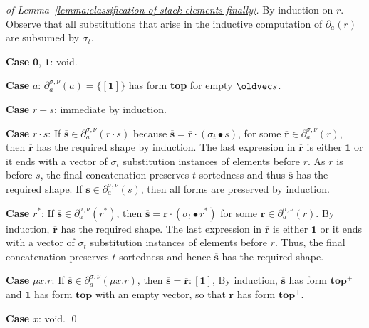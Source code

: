 \documentclass[runningheads, envcountsame, a4paper]{llncs}
\let\vec\oldvec
\newcommand\pderiv[3][{}]{\partial^{#1}_{#3}(#2)}
\newcommand\Rnull{\mathbf0}
\newcommand\Rempty{\mathbf1}
\newcommand\PUSH{:}
\newcommand\SINGLETON[1]{{[#1]}}
\newcommand\RS{\ensuremath{\overline{\mathbf{r}}}}
\renewcommand\SS{\ensuremath{\overline{\mathbf{s}}}}
\newcommand\ApplySubst[2]{#1 \bullet #2} %
\begin{document}
\begin{proof}[of Lemma~\ref{lemma:classification-of-stack-elements-finally}]
  By induction on $r$. Observe that all substitutions that arise in
  the inductive computation of $\pderiv{r}a$ are subsumed by $\sigma_t$.

  \textbf{Case }$\Rnull$, $\Rempty$: void.

  \textbf{Case }$a$: $\pderiv[\sigma,\nu]aa = \{ \SINGLETON\Rempty \}$
  has form \textbf{top} for empty $\vec s$.

  \textbf{Case }$r+s$: immediate by induction.

  \textbf{Case }$r\cdot s$: If $\SS \in \pderiv[\sigma,\nu]{r\cdot
    s}a$ because $\SS = \RS \cdot (\ApplySubst{\sigma_t} s) $, for some
  $\RS\in \pderiv[\sigma,\nu]ra$, then $\RS$ has the required shape by
  induction.
  The last expression in $\RS$  is either $\Rempty$ 
  or it ends with a vector of $\sigma_t$ substitution instances of
  elements before $r$. As $r$ is before $s$, the final concatenation
  preserves $t$-sortedness and thus $\SS$ has the required shape.
  If $\SS \in
  \pderiv[\sigma,\nu]sa$, then all forms are 
  preserved by induction.

  \textbf{Case }$r^*$:  If $\SS \in \pderiv[\sigma,\nu]{r^*}a$, then
  $\SS = \RS \cdot (\ApplySubst{\sigma_t} r^*)$ for some $\RS\in
  \pderiv[\sigma,\nu]ra$. By induction, $\RS$ has the required
  shape. The last expression in $\RS$ is either $\Rempty$ 
  or it ends with a vector of $\sigma_t$ substitution instances of
  elements before $r$. Thus, the final concatenation preserves
  $t$-sortedness and hence $\SS$ has the required shape.

  \textbf{Case }$\mu x.r$: 
  If $\SS \in \pderiv[\sigma,\nu]{\mu x.r}a$,
  then $\SS = \RS \PUSH \SINGLETON\Rempty$, By induction, $\SS$ has
  form $\mathbf{top}^+$ and $\Rempty$ has form $\mathbf{top}$ with an
  empty vector, so that $\RS$ has form $\mathbf{top}^+$. 

  \textbf{Case }$x$: void.
  \qed
\end{proof}
\end{document}

